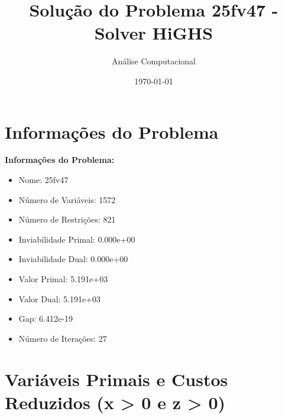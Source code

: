 \documentclass[12pt]{article}
\title{Solução do Problema 25fv47 - Solver HiGHS}
\author{Análise Computacional}
\date{\today}
\begin{document}
\maketitle

\section{Informações do Problema}

\textbf{Informações do Problema:}
\begin{itemize}
\item Nome: 25fv47
\item Número de Variáveis: 1572
\item Número de Restrições: 821
\item Inviabilidade Primal: 0.000e+00
\item Inviabilidade Dual: 0.000e+00
\item Valor Primal: 5.191e+03
\item Valor Dual: 5.191e+03
\item Gap: 6.412e-19
\item Número de Iterações: 27
\end{itemize}


\section{Variáveis Primais e Custos Reduzidos (x > 0 e z > 0)}
\end{document}
